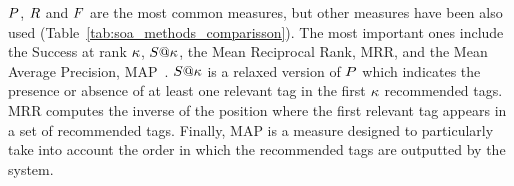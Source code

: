$P$, $R$ and $F$ are the most common measures, but other measures have been also used (Table~\ref{tab:soa_methods_comparisson}). The most important ones include the Success at rank $\kappa$, $S@\kappa$, the Mean Reciprocal Rank, $\text{MRR}$, and the Mean Average Precision, $\text{MAP}$~\citep{Manning2008}.
$S@\kappa$ is a relaxed version of $P$ which indicates the presence or absence of at least one relevant tag in the first $\kappa$ recommended tags.
$\text{MRR}$ computes the inverse of the position where the first relevant tag appears in a set of recommended tags.
Finally, $\text{MAP}$ is a measure designed to particularly take into account the order in which the recommended tags are outputted by the system.

